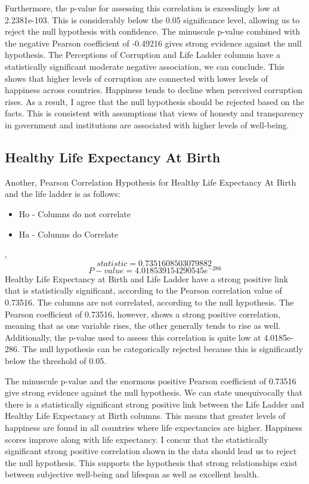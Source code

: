 \documentclass[12pt, a4paper, twoside]{report}
\theoremstyle{plain} %
\theoremstyle{definition} %
\theoremstyle{remark} %
\numberwithin{equation}{chapter}
\begin{document}
Furthermore, the p-value for assessing this correlation is exceedingly low at 2.2381e-103. This is considerably below the 0.05 significance level, allowing us to reject the null hypothesis with confidence. The minuscule p-value combined with the negative Pearson coefficient of -0.49216 gives strong evidence against the null hypothesis. The Perceptions of Corruption and Life Ladder columns have a statistically significant moderate negative association, we can conclude. This shows that higher levels of corruption are connected with lower levels of happiness across countries. Happiness tends to decline when perceived corruption rises. As a result, I agree that the null hypothesis should be rejected based on the facts. This is consistent with assumptions that views of honesty and transparency in government and institutions are associated with higher levels of well-being.

\subsection{Healthy Life Expectancy At Birth}
Another, Pearson Correlation Hypothesis for Healthy Life Expectancy At Birth and the life ladder is as follows:
\begin{itemize}
    \item Ho - Columns do not correlate
    \item Ha - Columns do Correlate
\end{itemize}
, 
 \[statistic = 0.7351608503079882\ \]
 \[P-value = 4.018539154290545 e^{-286}  \]
Healthy Life Expectancy at Birth and Life Ladder have a strong positive link that is statistically significant, according to the Pearson correlation value of 0.73516. The columns are not correlated, according to the null hypothesis. The Pearson coefficient of 0.73516, however, shows a strong positive correlation, meaning that as one variable rises, the other generally tends to rise as well. Additionally, the p-value used to assess this correlation is quite low at 4.0185e-286. The null hypothesis can be categorically rejected because this is significantly below the threshold of 0.05.

The minuscule p-value and the enormous positive Pearson coefficient of 0.73516 give strong evidence against the null hypothesis. We can state unequivocally that there is a statistically significant strong positive link between the Life Ladder and Healthy Life Expectancy at Birth columns. This means that greater levels of happiness are found in all countries where life expectancies are higher. Happiness scores improve along with life expectancy. I concur that the statistically significant strong positive correlation shown in the data should lead us to reject the null hypothesis. This supports the hypothesis that strong relationships exist between subjective well-being and lifespan as well as excellent health.
\end{document}
